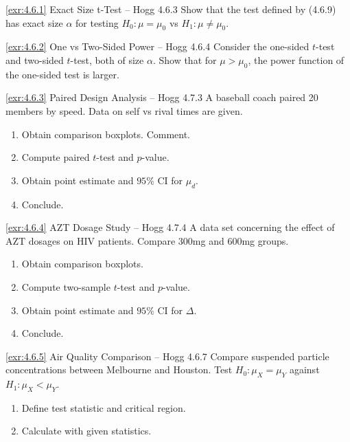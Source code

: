 \begin{exercise}{\ref{exr:4.6.1} Exact Size t-Test – Hogg 4.6.3}\label{exr:4.6.1}
Show that the test defined by (4.6.9) has exact size $\alpha$ for testing $H_0: \mu = \mu_0$ vs $H_1: \mu \neq \mu_0$.
\end{exercise}

\begin{exercise}{\ref{exr:4.6.2} One vs Two-Sided Power – Hogg 4.6.4}\label{exr:4.6.2}
Consider the one-sided $t$-test and two-sided $t$-test, both of size $\alpha$. Show that for $\mu > \mu_0$, the power function of the one-sided test is larger.
\end{exercise}

\begin{exercise}{\ref{exr:4.6.3} Paired Design Analysis – Hogg 4.7.3}\label{exr:4.6.3}
A baseball coach paired 20 members by speed. Data on self vs rival times are given.
\begin{enumerate}
\item[(a)] Obtain comparison boxplots. Comment.
\item[(b)] Compute paired $t$-test and $p$-value.
\item[(c)] Obtain point estimate and $95\%$ CI for $\mu_d$.
\item[(d)] Conclude.
\end{enumerate}
\end{exercise}

\begin{exercise}{\ref{exr:4.6.4} AZT Dosage Study – Hogg 4.7.4}\label{exr:4.6.4}
A data set concerning the effect of AZT dosages on HIV patients. Compare $300$mg and $600$mg groups.
\begin{enumerate}
\item[(a)] Obtain comparison boxplots.
\item[(b)] Compute two-sample $t$-test and $p$-value.
\item[(c)] Obtain point estimate and $95\%$ CI for $\Delta$.
\item[(d)] Conclude.
\end{enumerate}
\end{exercise}

\begin{exercise}{\ref{exr:4.6.5} Air Quality Comparison – Hogg 4.6.7}\label{exr:4.6.5}
Compare suspended particle concentrations between Melbourne and Houston. Test $H_0: \mu_X = \mu_Y$ against $H_1: \mu_X < \mu_Y$.
\begin{enumerate}
\item[(a)] Define test statistic and critical region.
\item[(b)] Calculate with given statistics.
\end{enumerate}
\end{exercise}

